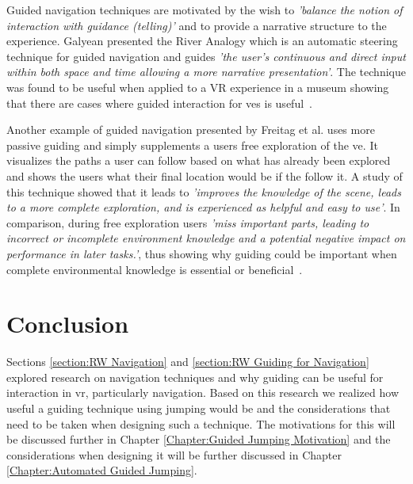 Guided navigation techniques are motivated by the wish to \textit{'balance the notion of interaction with guidance (telling)'} and to provide a narrative structure to the experience. Galyean presented the River Analogy which is an automatic steering technique for guided navigation and guides \textit{'the user’s continuous and direct input within both space and time allowing a more narrative presentation'}. The technique was found to be useful when applied to a VR experience in a museum showing that there are cases where guided interaction for \acrshort{ve}s is useful~\cite{Galyean1995}.

Another example of guided navigation presented by Freitag et al. uses more passive guiding and simply supplements a users free exploration of the \acrshort{ve}. It visualizes the paths a user can follow based on what has already been explored and shows the users what their final location would be if the follow it. A study of this technique showed that it leads to \textit{'improves the knowledge of the scene, leads to a more complete exploration, and is experienced as helpful and easy to use'}. In comparison, during free exploration users \textit{'miss important parts, leading to incorrect or incomplete environment knowledge and a potential negative impact on performance in later tasks.'}, thus showing why guiding could be important when complete environmental knowledge is essential or beneficial~\cite{Freitag2018}.

\section{Conclusion}
\label{section:RW Conclusion}
Sections \ref{section:RW Navigation} and \ref{section:RW Guiding for Navigation} explored research on navigation techniques and why guiding can be useful for interaction in \acrshort{vr}, particularly navigation. Based on this research we realized how useful a guiding technique using jumping would be and the considerations that need to be taken when designing such a technique. The motivations for this will be discussed further in Chapter \ref{Chapter:Guided Jumping Motivation} and the considerations when designing it will be further discussed in Chapter \ref{Chapter:Automated Guided Jumping}.